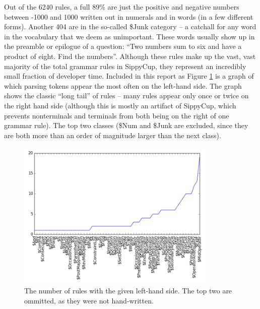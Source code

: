 \documentclass[11pt]{article}
\begin{document}
Out of the 6240 rules, a full 89\% are just the positive and negative numbers between -1000 and 1000 written out in numerals and in words (in a few different forms). Another 404 are in the so-called \$Junk category -- a catchall for any word in the vocabulary that we deem as unimportant. These words usually show up in the preamble or epilogue of a question: ``Two numbers sum to six and have a product of eight. Find the numbers''. Although these rules make up the vast, vast majority of the total grammar rules in SippyCup, they represent an incredibly small fraction of developer time. Included in this report as Figure \ref{fig:chart} is a graph of which parsing tokens appear the most often on the left-hand side.  The graph shows the classic ``long tail'' of rules -- many rules appear only once or twice on the right hand side (although this is mostly an artifact of SippyCup, which prevents nonterminals and terminals from both being on the right of one grammar rule). The top two classes (\$Num and \$Junk are excluded, since they are both more than an order of magnitude larger than the next class).

\begin{figure}[t]
    \centering
    \includegraphics[width=0.85\textwidth]{rules-bottom.png}
    \caption{The number of rules with the given left-hand side. The top two are ommitted, as they were not hand-written.}
    \label{fig:chart}
\end{figure}
\end{document}
